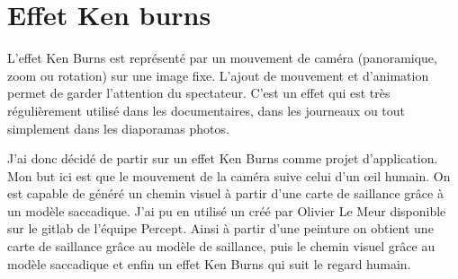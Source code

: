 \newpage
\section{Effet Ken burns}

\par
L'effet Ken Burns est représenté par un mouvement de caméra (panoramique, zoom ou rotation) sur une image fixe. L'ajout de mouvement et d'animation permet de garder l'attention du spectateur. C'est un effet qui est très régulièrement utilisé dans les documentaires, dans les journeaux ou tout simplement dans les diaporamas photos. 

\par
J'ai donc décidé de partir sur un effet Ken Burns comme projet d'application. Mon but ici est que le mouvement de la caméra suive celui d'un \oe{}il humain. On est capable de généré un chemin visuel à partir d'une carte de saillance grâce à un modèle saccadique. J'ai pu en utilisé un créé par Olivier Le Meur \cite{saccadicmodel} disponible sur le gitlab de l'équipe Percept. Ainsi à partir d'une peinture on obtient une carte de saillance grâce au modèle de saillance, puis le chemin visuel grâce au modèle saccadique et enfin un effet Ken Burns qui suit le regard humain.

\par
